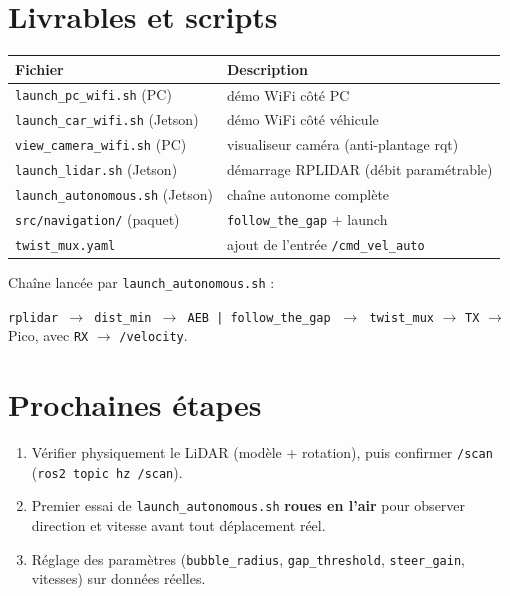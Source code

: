 \documentclass[a4paper,11pt]{article}
\begin{document}
\section{Livrables et scripts}
\begin{table}[H]
\centering
\begin{tabularx}{\textwidth}{@{}l X@{}}
\toprule
\textbf{Fichier} & \textbf{Description} \\
\midrule
\texttt{launch\_pc\_wifi.sh} (PC)        & démo WiFi côté PC \\
\texttt{launch\_car\_wifi.sh} (Jetson)   & démo WiFi côté véhicule \\
\texttt{view\_camera\_wifi.sh} (PC)      & visualiseur caméra (anti-plantage rqt) \\
\texttt{launch\_lidar.sh} (Jetson)       & démarrage RPLIDAR (débit paramétrable) \\
\texttt{launch\_autonomous.sh} (Jetson)  & chaîne autonome complète \\
\texttt{src/navigation/} (paquet)        & \texttt{follow\_the\_gap} + launch \\
\texttt{twist\_mux.yaml}                 & ajout de l'entrée \texttt{/cmd\_vel\_auto} \\
\bottomrule
\end{tabularx}
\end{table}

\noindent Chaîne lancée par \texttt{launch\_autonomous.sh} :
\begin{center}
\texttt{rplidar $\rightarrow$ dist\_min $\rightarrow$ AEB \;|\; follow\_the\_gap}
$\;\rightarrow\;$ \texttt{twist\_mux} $\rightarrow$ \texttt{TX} $\rightarrow$ Pico,
avec \texttt{RX} $\rightarrow$ \texttt{/velocity}.
\end{center}

\section{Prochaines étapes}
\begin{enumerate}[leftmargin=1.6em]
  \item Vérifier physiquement le LiDAR (modèle + rotation), puis confirmer
        \texttt{/scan} (\texttt{ros2 topic hz /scan}).
  \item Premier essai de \texttt{launch\_autonomous.sh} \textbf{roues en l'air}
        pour observer direction et vitesse avant tout déplacement réel.
  \item Réglage des paramètres (\texttt{bubble\_radius}, \texttt{gap\_threshold},
        \texttt{steer\_gain}, vitesses) sur données réelles.
\end{enumerate}
\end{document}
